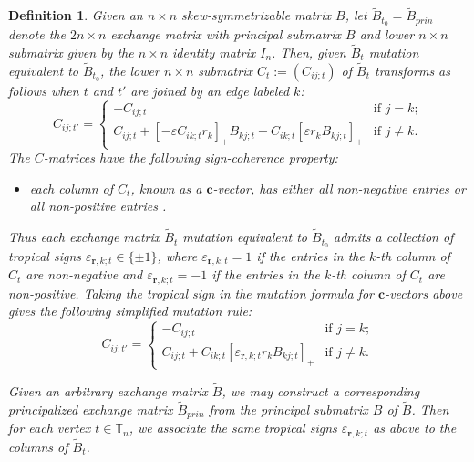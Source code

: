 \documentclass{amsart}
\newtheorem{definition}[theorem]{Definition}
\numberwithin{equation}{section}
\newcommand{\bfc}{\mathbf{c}}
\newcommand{\bfr}{{\boldsymbol{r}}}
\newcommand{\TT}{\mathbb{T}}
\begin{document}
\begin{definition}
  \label{def:tropical signs}
  Given an $n\times n$ skew-symmetrizable matrix $B$, let $\tilde B_{t_0}=\tilde B_{prin}$ denote the $2n\times n$ exchange matrix with principal submatrix $B$ and lower $n\times n$ submatrix given by the $n\times n$ identity matrix $I_n$.
  Then, given $\tilde B_t$ mutation equivalent to $\tilde B_{t_0}$, the lower $n\times n$ submatrix $C_t:=(C_{ij;t})$ of $\tilde B_t$ transforms as follows when $t$ and $t'$ are joined by an edge labeled $k$:
  \begin{equation}
    \label{eq:c-matrix mutation1}
    C_{ij;t'}=
    \begin{cases}
      -C_{ij;t} & \text{if $j=k$;}\\
      C_{ij;t}+[-\varepsilon C_{ik;t} r_k]_+B_{kj;t}+C_{ik;t}[\varepsilon r_kB_{kj;t}]_+ & \text{if $j\ne k$.}
    \end{cases}
  \end{equation}
  The $C$-matrices have the following \emph{sign-coherence} property: 
  \begin{itemize}
    \item each column of $C_t$, known as a \emph{$\bfc$-vector}, has either all non-negative entries or all non-positive entries \cite{FZ07,NZ12,GHKK14,NR16}.
  \end{itemize}
  Thus each exchange matrix $\tilde B_t$ mutation equivalent to $\tilde B_{t_0}$ admits a collection of \emph{tropical signs} $\varepsilon_{\bfr,k;t}\in\{\pm1\}$, where $\varepsilon_{\bfr,k;t}=1$ if the entries in the $k$-th column of $C_t$ are non-negative and $\varepsilon_{\bfr,k;t}=-1$ if the entries in the $k$-th column of $C_t$ are non-positive. 
  Taking the tropical sign in the mutation formula for $\bfc$-vectors above gives the following simplified mutation rule:
  \begin{equation}
    \label{eq:c-matrix mutation2}
    C_{ij;t'}=
    \begin{cases}
      -C_{ij;t} & \text{if $j=k$;}\\
      C_{ij;t}+C_{ik;t}[\varepsilon_{\bfr,k;t} r_kB_{kj;t}]_+ & \text{if $j\ne k$.}
    \end{cases}
  \end{equation}

  Given an arbitrary exchange matrix $\tilde B$, we may construct a corresponding principalized exchange matrix $\tilde B_{prin}$ from the principal submatrix $B$ of $\tilde B$.
  Then for each vertex $t\in\TT_n$, we associate the same tropical signs $\varepsilon_{\bfr,k;t}$ as above to the columns of $\tilde B_t$.
\end{definition}
\end{document}
